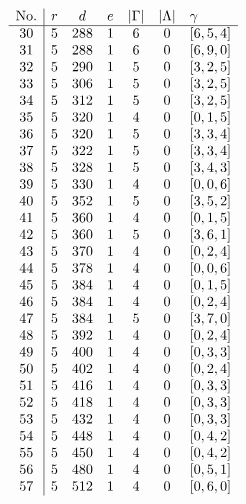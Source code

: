 \hfill
\begin{minipage}[t]{0.49\textwidth}
\centering
$\begin{array}[t]{c|ccccc l}
\textrm{No.} & r & d & e & |\Gamma| & |\Lambda| & \gamma \\
\hline
30 & 5 & 288 & 1 & 6 & 0 & [6, 5, 4] \\
31 & 5 & 288 & 1 & 6 & 0 & [6, 9, 0] \\
32 & 5 & 290 & 1 & 5 & 0 & [3, 2, 5] \\
33 & 5 & 306 & 1 & 5 & 0 & [3, 2, 5] \\
34 & 5 & 312 & 1 & 5 & 0 & [3, 2, 5] \\
35 & 5 & 320 & 1 & 4 & 0 & [0, 1, 5] \\
36 & 5 & 320 & 1 & 5 & 0 & [3, 3, 4] \\
37 & 5 & 322 & 1 & 5 & 0 & [3, 3, 4] \\
38 & 5 & 328 & 1 & 5 & 0 & [3, 4, 3] \\
39 & 5 & 330 & 1 & 4 & 0 & [0, 0, 6] \\
40 & 5 & 352 & 1 & 5 & 0 & [3, 5, 2] \\
41 & 5 & 360 & 1 & 4 & 0 & [0, 1, 5] \\
42 & 5 & 360 & 1 & 5 & 0 & [3, 6, 1] \\
43 & 5 & 370 & 1 & 4 & 0 & [0, 2, 4] \\
44 & 5 & 378 & 1 & 4 & 0 & [0, 0, 6] \\
45 & 5 & 384 & 1 & 4 & 0 & [0, 1, 5] \\
46 & 5 & 384 & 1 & 4 & 0 & [0, 2, 4] \\
47 & 5 & 384 & 1 & 5 & 0 & [3, 7, 0] \\
48 & 5 & 392 & 1 & 4 & 0 & [0, 2, 4] \\
49 & 5 & 400 & 1 & 4 & 0 & [0, 3, 3] \\
50 & 5 & 402 & 1 & 4 & 0 & [0, 2, 4] \\
51 & 5 & 416 & 1 & 4 & 0 & [0, 3, 3] \\
52 & 5 & 418 & 1 & 4 & 0 & [0, 3, 3] \\
53 & 5 & 432 & 1 & 4 & 0 & [0, 3, 3] \\
54 & 5 & 448 & 1 & 4 & 0 & [0, 4, 2] \\
55 & 5 & 450 & 1 & 4 & 0 & [0, 4, 2] \\
56 & 5 & 480 & 1 & 4 & 0 & [0, 5, 1] \\
57 & 5 & 512 & 1 & 4 & 0 & [0, 6, 0] \\
\end{array}$
\end{minipage}
\par
\endgroup
